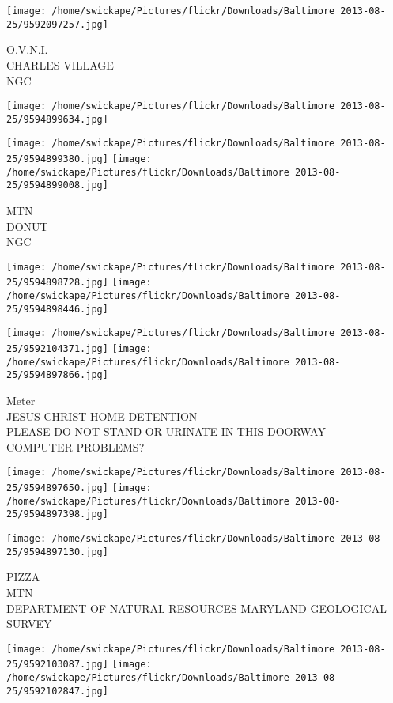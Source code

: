 \documentclass[10pt,letterpaper]{article}
\begin{document}
\texttt{[image: /home/swickape/Pictures/flickr/Downloads/Baltimore 2013-08-25/9592097257.jpg]}

O.V.N.I.\\
CHARLES VILLAGE\\
NGC
\pagebreak

\texttt{[image: /home/swickape/Pictures/flickr/Downloads/Baltimore 2013-08-25/9594899634.jpg]}

\vspace{0.25in}
\texttt{[image: /home/swickape/Pictures/flickr/Downloads/Baltimore 2013-08-25/9594899380.jpg]}
\texttt{[image: /home/swickape/Pictures/flickr/Downloads/Baltimore 2013-08-25/9594899008.jpg]}

MTN\\
DONUT\\
NGC
\pagebreak

\texttt{[image: /home/swickape/Pictures/flickr/Downloads/Baltimore 2013-08-25/9594898728.jpg]}
\texttt{[image: /home/swickape/Pictures/flickr/Downloads/Baltimore 2013-08-25/9594898446.jpg]}

\texttt{[image: /home/swickape/Pictures/flickr/Downloads/Baltimore 2013-08-25/9592104371.jpg]}
\texttt{[image: /home/swickape/Pictures/flickr/Downloads/Baltimore 2013-08-25/9594897866.jpg]}

Meter\\
JESUS CHRIST HOME DETENTION\\
PLEASE DO NOT STAND OR URINATE IN THIS DOORWAY\\
COMPUTER PROBLEMS?
\pagebreak

\texttt{[image: /home/swickape/Pictures/flickr/Downloads/Baltimore 2013-08-25/9594897650.jpg]}
\texttt{[image: /home/swickape/Pictures/flickr/Downloads/Baltimore 2013-08-25/9594897398.jpg]}

\vspace{0.25in}
\texttt{[image: /home/swickape/Pictures/flickr/Downloads/Baltimore 2013-08-25/9594897130.jpg]}

PIZZA\\
MTN\\
DEPARTMENT OF NATURAL RESOURCES MARYLAND GEOLOGICAL SURVEY
\pagebreak

\texttt{[image: /home/swickape/Pictures/flickr/Downloads/Baltimore 2013-08-25/9592103087.jpg]}
\texttt{[image: /home/swickape/Pictures/flickr/Downloads/Baltimore 2013-08-25/9592102847.jpg]}
\end{document}
